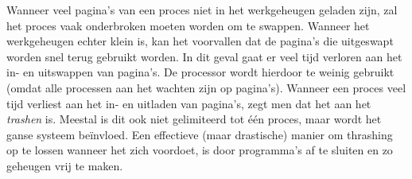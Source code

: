Wanneer veel pagina's van een proces niet in het werkgeheugen geladen zijn, zal het proces vaak onderbroken moeten worden om te swappen. Wanneer het werkgeheugen echter klein is, kan het voorvallen dat de pagina's die uitgeswapt worden snel terug gebruikt worden. In dit geval gaat er veel tijd verloren aan het in- en uitswappen van pagina's. De processor wordt hierdoor te weinig gebruikt (omdat alle processen aan het wachten zijn op pagina's). Wanneer een proces veel tijd verliest aan het in- en uitladen van pagina's, zegt men dat het aan het \emph{trashen} is. Meestal is dit ook niet gelimiteerd tot \'e\'en proces, maar wordt het ganse systeem be\"invloed. Een effectieve (maar drastische) manier om thrashing op te lossen wanneer het zich voordoet, is door programma's af te sluiten en zo geheugen vrij te maken.






